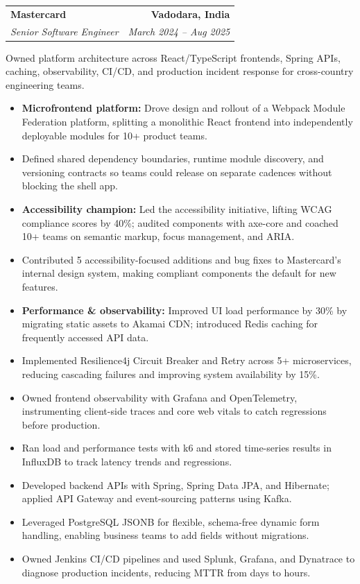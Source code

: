 \documentclass[letterpaper,11pt]{article}
\makeatletter
\newcommand{\resumeItem}[1]{
  \item\small{
    {#1 \vspace{-3pt}}
  }
}
\newcommand{\resumeSubheading}[4]{
  \vspace{-3pt}\item
    \begin{tabular*}{1.0\textwidth}[t]{l@{\extracolsep{\fill}}r}
      \textbf{#1} & \textbf{\small #2} \\
      \textit{\small#3} & \textit{\small #4} \\
    \end{tabular*}\vspace{-4pt}
}
\newcommand{\resumeRoleSummary}[1]{
  {\small #1\par}
  \vspace{-2pt}
}
\newcommand{\resumeItemListStart}{\begin{itemize}}
\newcommand{\resumeItemListEnd}{\end{itemize}\vspace{0pt}}
\makeatother
\begin{document}
    \resumeSubheading
      {Mastercard}{Vadodara, India}
      {Senior Software Engineer}{March 2024 -- Aug 2025}
    \resumeRoleSummary{Owned platform architecture across React/TypeScript frontends, Spring APIs, caching, observability, CI/CD, and production incident response for cross-country engineering teams.}
    \resumeItemListStart
      \resumeItem{\textbf{Microfrontend platform:} Drove design and rollout of a Webpack Module Federation platform, splitting a monolithic React frontend into independently deployable modules for 10+ product teams.}
      \resumeItem{Defined shared dependency boundaries, runtime module discovery, and versioning contracts so teams could release on separate cadences without blocking the shell app.}
      \resumeItem{\textbf{Accessibility champion:} Led the accessibility initiative, lifting WCAG compliance scores by 40\%; audited components with axe-core and coached 10+ teams on semantic markup, focus management, and ARIA.}
      \resumeItem{Contributed 5 accessibility-focused additions and bug fixes to Mastercard's internal design system, making compliant components the default for new features.}
      \resumeItem{\textbf{Performance \& observability:} Improved UI load performance by 30\% by migrating static assets to Akamai CDN; introduced Redis caching for frequently accessed API data.}
      \resumeItem{Implemented Resilience4j Circuit Breaker and Retry across 5+ microservices, reducing cascading failures and improving system availability by 15\%.}
      \resumeItem{Owned frontend observability with Grafana and OpenTelemetry, instrumenting client-side traces and core web vitals to catch regressions before production.}
      \resumeItem{Ran load and performance tests with k6 and stored time-series results in InfluxDB to track latency trends and regressions.}
      \resumeItem{Developed backend APIs with Spring, Spring Data JPA, and Hibernate; applied API Gateway and event-sourcing patterns using Kafka.}
      \resumeItem{Leveraged PostgreSQL JSONB for flexible, schema-free dynamic form handling, enabling business teams to add fields without migrations.}
      \resumeItem{Owned Jenkins CI/CD pipelines and used Splunk, Grafana, and Dynatrace to diagnose production incidents, reducing MTTR from days to hours.}
    \resumeItemListEnd
\end{document}
